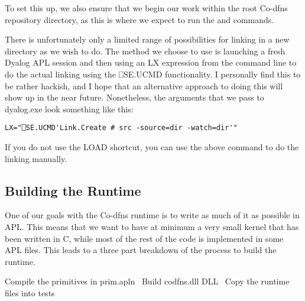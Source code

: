 \documentclass{article}%
\begin{document}
To set this up, we also ensure that we begin our work within the
root Co-dfns repository directory, as this is where we expect to run
the {\Tt{}\nwendquote} and {\Tt{}\nwendquote} commands.

There is unfortunately only a limited range of possibilities for
linking in a new directory as we wish to do.
The method we choose to use is launching a fresh Dyalog APL session
and then using an {\Tt{}LX\nwendquote} expression from the command line
to do the actual linking using the {\Tt{}⎕SE.UCMD\nwendquote} functionality.
I personally find this to be rather hackish, and I hope that an
alternative approach to doing this will show up in the near future.
Nonetheless, the arguments that we pass to {\Tt{}dyalog.exe\nwendquote}
look something like this:

\begin{verbatim}
LX="⎕SE.UCMD'Link.Create # src -source=dir -watch=dir'"
\end{verbatim}

If you do not use the {\Tt{}LOAD\nwendquote} shortcut, you can use the above
command to do the linking manually.

\subsection{Building the Runtime}

One of our goals with the Co-dfns runtime is to write as much of it
as possible in APL.
This means that we want to have at minimum a very small kernel that
has been written in C,
while most of the rest of the code is implemented in some APL files.
This leads to a three part breakdown of the process to
build the runtime.

\nwenddocs{}\endmoddef\nwstartdeflinemarkup{}\nwenddeflinemarkup
\LA{}Compile the primitives in \code{}prim.apln\edoc{}~{\nwtagstyle{}}\RA{}
\LA{}Build \code{}codfns.dll\edoc{} DLL~{\nwtagstyle{}}\RA{}
\LA{}Copy the runtime files into \code{}tests{\nwbackslash}\edoc{}~{\nwtagstyle{}}\RA{}
\nwendcode{}\nwdocspar
\end{document}

